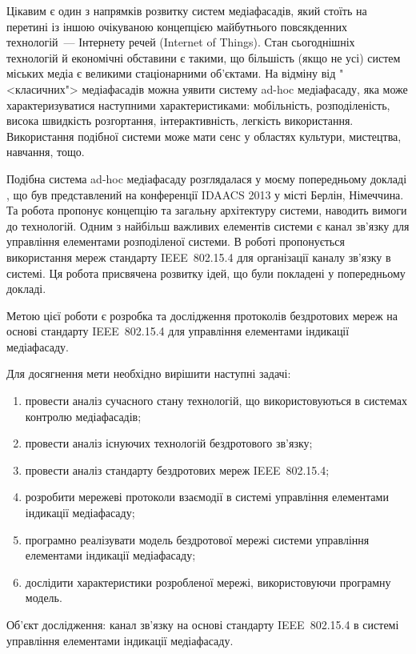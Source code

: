 \documentclass[a4paper,ukrainian,utf8,nocolumnsxix,floatsection,equationsection]{eskdtext}
\newcommand{\iee}[0]{IEEE~802.15.4\xspace}
\begin{document}
Цікавим є один з напрямків розвитку систем медіафасадів, який стоїть на перетині із іншою очікуваною концепцією майбутнього повсякденних технологій~--- Інтернету речей (Internet of Things). Стан сьогоднішніх технологій й економічні обставини є такими, що більшість (якщо не усі) систем міських медіа є великими стаціонарними об’єктами. На відміну від "<класичних"> медіафасадів можна уявити систему ad-hoc медіафасаду, яка може характеризуватися наступними характеристиками: мобільність, розподіленість, висока швидкість розгортання, інтерактивність, легкість використання. Використання подібної системи може мати сенс у областях культури, мистецтва, навчання, тощо.

Подібна система ad-hoc медіафасаду розглядалася у моєму попередньому докладі \cite{idaacs:2013:adhoc:media:facade}, що був представлений на конференції IDAACS 2013 у місті Берлін, Німеччина. Та робота пропонує концепцію та загальну архітектуру системи, наводить вимоги до технологій. Одним з найбільш важливих елементів системи є канал зв’язку для управління елементами розподіленої системи. В роботі пропонується використання мереж стандарту \iee для організації каналу зв’язку в системі. Ця робота присвячена розвитку ідей, що були покладені у попередньому докладі.

Метою цієї роботи є розробка та дослідження протоколів бездротових мереж на основі стандарту \iee для управління елементами індикації медіафасаду.

Для досягнення мети необхідно вирішити наступні задачі:
\begin{enumerate}
	\item провести аналіз сучасного стану технологій, що використовуються в системах контролю медіафасадів;
	\item провести аналіз існуючих технологій бездротового зв’язку;
	\item провести аналіз стандарту бездротових мереж \iee;
	\item розробити мережеві протоколи взаємодії в системі управління елементами індикації медіафасаду;
	\item\label{task:create_model} програмно реалізувати модель бездротової мережі системи управління елементами індикації медіафасаду;
	\item\label{task:do_simulation} дослідити характеристики розробленої мережі, використовуючи програмну модель.
\end{enumerate}

Об’єкт дослідження: канал зв’язку на основі стандарту \iee в системі управління елементами індикації медіафасаду.
\end{document}
